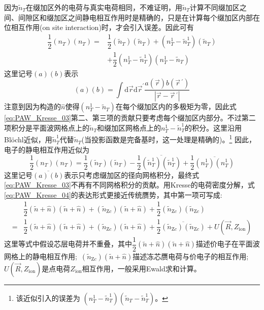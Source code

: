 因为$\tilde n_T$在缀加区外的电荷与真实电荷相同，不难证明，用$\tilde n_T$计算不同缀加区之间、间隙区和缀加区之间静电相互作用时是精确的，只是在计算每个缀加区内部在位相互作用(on site interaction)时，才会引入误差。因此可有
\begin{equation}
	\begin{aligned}
		\dfrac12(n_T)(n_T)=&\dfrac12(\tilde n_T)(\tilde n_T)+(n_T^1-\tilde n_T^1)(\tilde n_T)\\
				&+\dfrac12(n_T^1-\tilde n_T^1)(n_T^1-\tilde n_T)
	\end{aligned}
	\label{eq:PAW_Kresse_03}
\end{equation}
这里记号$(a)(b)$表示$$(a)(b)=\int\mathrm{d}\vec r\mathrm{d}\vec r^{\prime}\dfrac{a(\vec r)b(\vec r\,^{\prime})}{|\vec r-\vec r\,^{\prime}|}$$
注意到因为构造的$\hat n$使得$(n_T^1-\tilde n_T)$在每个缀加区内的多极矩为零，因此式\eqref{eq:PAW_Kresse_03}第二、第三项的贡献只要考虑每个缀加区内部分。不过第二项积分是平面波网格点上的$\tilde n_T$和缀加区网格点上的$n_T^1-\tilde n_T^1$的积分。这里沿用\textrm{Bl\"ochl}近似，用$\tilde n_T^1$代替$\tilde n_T$(当投影函数是完备基时，这一处理是精确的)。\footnote{该近似引入的误差为
$(n_T^1-\tilde n_T^1)(\tilde n_T-\tilde n_T^1)$。}
因此，电子的静电相互作用近似为
\begin{equation}
	\dfrac12(n_T)(n_T)=\dfrac12(\tilde n_T)(\tilde n_T)-\dfrac12\overline{(\tilde n_T^1)(\tilde n_T^1)}+\dfrac12\overline{(n_T^1)(n_T^1)}
	\label{eq:PAW_Kresse_04}
\end{equation}
这里记号$\overline{(a)(b)}$表示只考虑缀加区的径向网格积分，最终式\eqref{eq:PAW_Kresse_03}不再有不同网格积分的贡献。用\textrm{Kresse}的电荷密度分解，式\eqref{eq:PAW_Kresse_04}的表达形式更接近传统赝势，其中第一项可写成:
\begin{equation}
	\begin{aligned}
		&\dfrac12(\tilde n+\hat n)(\tilde n+\hat n)+(\tilde n_{\mathrm{Z}c})(\tilde n+\hat n)+\dfrac12(\tilde n_{\mathrm{Z}c})(\tilde n_{\mathrm{Z}c})\\
		=&\dfrac12(\tilde n+\hat n)(\tilde n+\hat n)+(\tilde n_{\mathrm{Z}c})(\tilde n+\hat n)+\dfrac12\overline{(\tilde n_{\mathrm{Z}c})(\tilde n_{\mathrm{Z}c})}+U(\vec R,Z_{\mathrm{ion}})
	\end{aligned}
	\label{eq:PAW_Kresse_05}
\end{equation}
这里等式中假设芯层电荷并不重叠，其中$\dfrac12(\tilde n+\hat n)(\tilde n+\hat n)$描述价电子在平面波网格上的静电相互作用;~$(\tilde n_{\mathrm{Z}c})(\tilde n+\hat n)$描述冻芯赝电荷与价电子的相互作用;~$U(\vec R,Z_{\mathrm{ion}})$是点电荷$Z_{\mathrm{ion}}$相互作用，一般采用\textrm{Ewald}求和计算。


